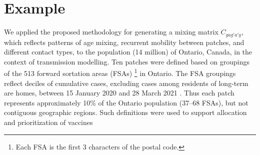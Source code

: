 \section{Example}\label{ex}
We applied the proposed methodology for generating a mixing matrix $C_{gag'a'y}$,
which reflects patterns of age mixing, recurrent mobility between patches, and different contact types,
to the population (14 million) of Ontario, Canada, in the context of \covid transmission modelling.
Ten patches were defined based on groupings of the 513 forward sortation areas (FSAs)%
\footnote{Each FSA is the first 3 characters of the postal code.} in Ontario.
The FSA groupings reflect deciles of cumulative \covid cases,
excluding cases among residents of long-term are homes,
between 15 January 2020 and 28 March 2021 \cite{ICES2020}.
Thus each patch represents approximately 10\% of the Ontario population (\mbox{37--68} FSAs),
but not contiguous geographic regions.
Such definitions were used to support allocation and prioritization of \covid vaccines
